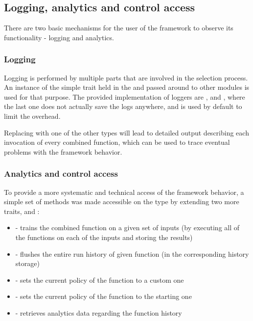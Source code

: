 \subsection{Logging, analytics and control access}

There are two basic mechanisms for the user of the framework to observe its functionality - logging and analytics.

\subsubsection{Logging}

Logging is performed by multiple parts that are involved in the selection process. An instance of the simple  trait held in the  and passed around to other modules is used for that purpose. The provided implementation of loggers are ,  and , where the last one does not actually save the logs anywhere, and is used by default to limit the overhead.

Replacing  with one of the other types will lead to detailed output describing each invocation of every combined function, which can be used to trace eventual problems with the framework behavior.

\subsubsection{Analytics and control access}
\label{subsubsec:analytics}

To provide a more systematic and technical access of the framework behavior, a simple set of methods was made accessible on the  type by extending two more traits,  and :

\begin{itemize}
	\item {} - trains the combined function on a given set of inputs (by executing all of the functions on each of the inputs and storing the results)
	\item {} - flushes the entire run history of given function (in the corresponding history storage)
	\item {} - sets the current policy of the function to a custom one
	\item {} - sets the current policy of the function to the starting one
	\item {} - retrieves analytics data regarding the function history
\end{itemize}

